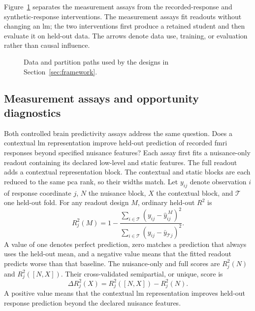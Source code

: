 Figure~\ref{fig:data-partition-routes} separates the measurement assays from the recorded-response and synthetic-response interventions.
The measurement assays fit readouts without changing an \ac{lm}; the two interventions first produce a retained student and then evaluate it on held-out data.
The arrows denote data use, training, or evaluation rather than causal influence.

\begin{figure}[tbp]
  \centering
  \resizebox{\textwidth}{!}{}
  \caption{Data and partition paths used by the designs in Section~\ref{sec:framework}.}
  \label{fig:data-partition-routes}
\end{figure}

\subsection{Measurement assays and opportunity diagnostics}
\label{sec:measurement-prerequisites}

Both controlled brain predictivity assays address the same question.
Does a contextual \ac{lm} representation improve held-out prediction of recorded \ac{fmri} responses beyond specified nuisance features?
Each assay first fits a nuisance-only readout containing its declared low-level and static features.
The full readout adds a contextual representation block.
The contextual and static blocks are each reduced to the same \ac{pca} rank, so their widths match.
Let \(y_{ij}\) denote observation \(i\) of response coordinate \(j\), \(N\) the nuisance block, \(X\) the contextual block, and \(\mathcal T\) one held-out fold.
For any readout design \(M\), ordinary held-out \(R^2\) is
\begin{equation}
R_j^2(M)
=
1-
\frac{\sum_{i\in\mathcal T}(y_{ij}-\widehat y_{ij}^{\,M})^2}
{\sum_{i\in\mathcal T}(y_{ij}-\bar y_{\mathcal Tj})^2}.
\label{eq:heldout-r2}
\end{equation}
A value of one denotes perfect prediction, zero matches a prediction that always uses the held-out mean, and a negative value means that the fitted readout predicts worse than that baseline.
The nuisance-only and full scores are \(R_j^2(N)\) and \(R_j^2([N,X])\).
Their cross-validated semipartial, or unique, score is
\begin{equation}
\Delta R_j^2(X)
=
R_j^2([N,X])-R_j^2(N).
\label{eq:semipartial-r2}
\end{equation}
A positive value means that the contextual \ac{lm} representation improves held-out response prediction beyond the declared nuisance features.

